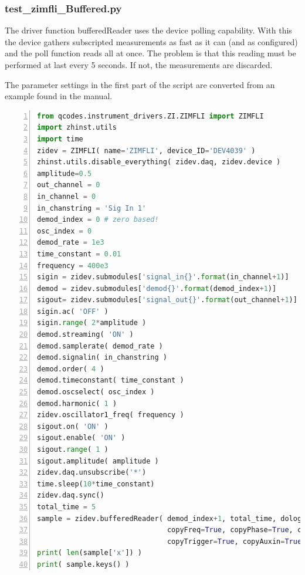 \documentclass[11pt]{article} %
\begin{document}
\subsubsection{test\_zimfli\_Buffered.py}
The driver function bufferedReader uses the device polling capability. With this the device gathers subscripted measurements as fast as it can (and as configured) and the poll function reads all at once. The problem is that this reading must be performed at last every 5 seconds. If not, the measurements are discarded.

The parameter settings in the first part of the script are converted from an example found in the manual.
\begin{lstlisting}[frame=single, language=Python, numbers=left, xleftmargin=1cm]
from qcodes.instrument_drivers.ZI.ZIMFLI import ZIMFLI
import zhinst.utils
import time
zidev = ZIMFLI( name='ZIMFLI', device_ID='DEV4039' )
zhinst.utils.disable_everything( zidev.daq, zidev.device )
amplitude=0.5
out_channel = 0
in_channel = 0
in_chanstring = 'Sig In 1'
demod_index = 0 # zero based!
osc_index = 0
demod_rate = 1e3
time_constant = 0.01
frequency = 400e3
sigin = zidev.submodules['signal_in{}'.format(in_channel+1)]
demod = zidev.submodules['demod{}'.format(demod_index+1)]
sigout= zidev.submodules['signal_out{}'.format(out_channel+1)]
sigin.ac( 'OFF' )
sigin.range( 2*amplitude )
demod.streaming( 'ON' )
demod.samplerate( demod_rate )
demod.signalin( in_chanstring )
demod.order( 4 )
demod.timeconstant( time_constant )
demod.oscselect( osc_index )
demod.harmonic( 1 )
zidev.oscillator1_freq( frequency )
sigout.on( 'ON' )
sigout.enable( 'ON' )
sigout.range( 1 )
sigout.amplitude( amplitude )
zidev.daq.unsubscribe('*')
time.sleep(10*time_constant)
zidev.daq.sync()
total_time = 5
sample = zidev.bufferedReader( demod_index+1, total_time, dolog=True,
                               copyFreq=True, copyPhase=True, copyDIO=True,
                               copyTrigger=True, copyAuxin=True )
print( len(sample['x']) )
print( sample.keys() )
\end{lstlisting}
\end{document}
